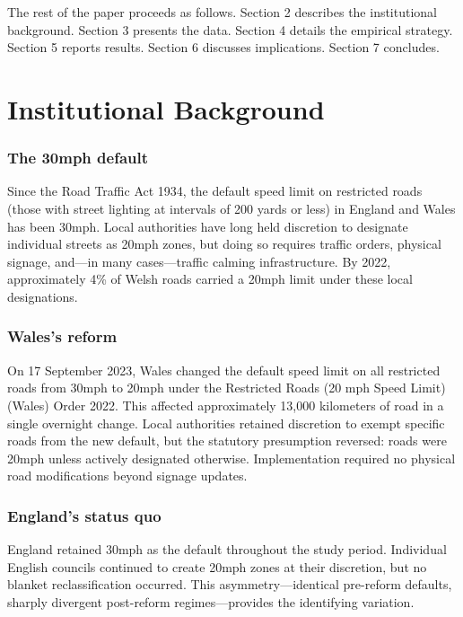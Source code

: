 \documentclass[12pt]{article}
\begin{document}
The rest of the paper proceeds as follows. Section 2 describes the institutional background. Section 3 presents the data. Section 4 details the empirical strategy. Section 5 reports results. Section 6 discusses implications. Section 7 concludes.

\section{Institutional Background}

\subsubsection*{The 30mph default} Since the Road Traffic Act 1934, the default speed limit on restricted roads (those with street lighting at intervals of 200 yards or less) in England and Wales has been 30mph. Local authorities have long held discretion to designate individual streets as 20mph zones, but doing so requires traffic orders, physical signage, and---in many cases---traffic calming infrastructure. By 2022, approximately 4\% of Welsh roads carried a 20mph limit under these local designations.

\subsubsection*{Wales's reform} On 17 September 2023, Wales changed the default speed limit on all restricted roads from 30mph to 20mph under the Restricted Roads (20 mph Speed Limit) (Wales) Order 2022. This affected approximately 13,000 kilometers of road in a single overnight change. Local authorities retained discretion to exempt specific roads from the new default, but the statutory presumption reversed: roads were 20mph unless actively designated otherwise. Implementation required no physical road modifications beyond signage updates.

\subsubsection*{England's status quo} England retained 30mph as the default throughout the study period. Individual English councils continued to create 20mph zones at their discretion, but no blanket reclassification occurred. This asymmetry---identical pre-reform defaults, sharply divergent post-reform regimes---provides the identifying variation.
\end{document}
